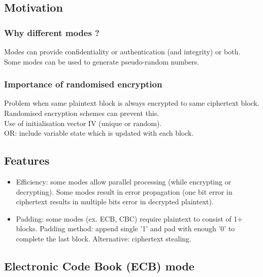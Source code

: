 \documentclass{article}
\begin{document}
\subsection{Motivation}

\subsubsection{Why different modes ?}

Modes can provide confidentiality or authentication (and integrity) or both.\\
Some modes can be used to generate pseudo-random numbers.

\subsubsection{Importance of randomised encryption}

Problem when same plaintext block is always encrypted to same ciphertext block. \\
Randomised encryption schemes can prevent this.\\
Use of initialisation vector IV (unique or random).\\
OR: include variable state which is updated with each block.

\subsection{Features}

\begin{itemize}
    \item Efficiency: some modes allow parallel processing (while encrypting or decrypting). Some modes result in error propagation (one bit error in ciphertext results in multiple bits error in decrypted plaintext).
    \item Padding: some modes (ex. ECB, CBC) require plaintext to consist of 1+ blocks. Padding method: append single '1' and pad with enough '0' to complete the last block. Alternative: ciphertext stealing.
\end{itemize}

\subsection{Electronic Code Book (ECB) mode}
\end{document}
